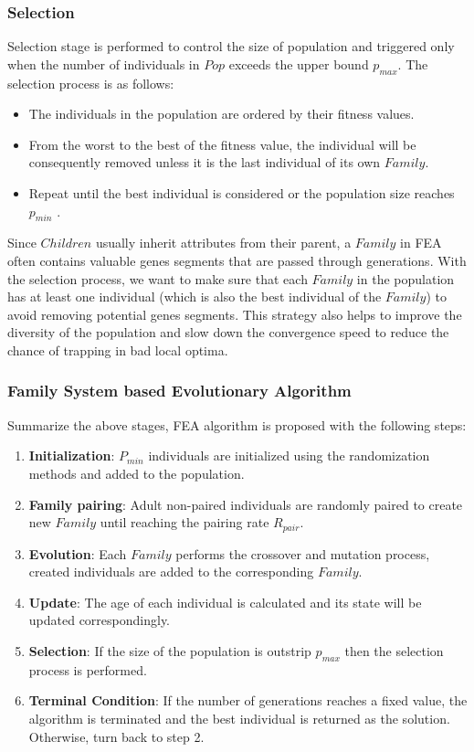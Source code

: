 \documentclass[final]{elsarticle}
\begin{document}
\subsubsection{Selection}

Selection stage is performed to control the size of population and triggered only when the number of individuals in $Pop$ exceeds the upper bound $p_{max}$. The selection process is as follows: 
\begin{itemize}
	\item The individuals in the population are ordered by their fitness values. 
	\item From the worst to the best of the fitness value, the individual will be consequently removed unless it is the last individual of its own $ Family $. 
	\item Repeat until the best individual is considered or the population size reaches $p_{min}$ .
\end{itemize}
Since $Children$ usually inherit attributes from their parent, a $Family$ in FEA often contains valuable genes segments that are passed through generations. With the selection process, we want to make sure that each $ Family $ in the population has at least one individual (which is also the best individual of the $ Family $) to avoid removing potential genes segments. This strategy also helps to improve the diversity of the population and slow down the convergence speed to reduce the chance of trapping in bad local optima.

\subsubsection{Family System based Evolutionary Algorithm}

Summarize the above stages, FEA algorithm is proposed with the following steps:

\begin{enumerate}
	\item \textbf{Initialization}: $P_{min}$ individuals are initialized using the randomization methods and added to the population.
	\item \textbf{Family pairing}: Adult non-paired individuals are randomly paired to create new $ Family $ until reaching the pairing rate $R_{pair}$.
	\item \textbf{Evolution}: Each $ Family $ performs the crossover and mutation process, created individuals are added to the corresponding $ Family $.
	\item \textbf{Update}: The age of each individual is calculated and its state will be updated correspondingly.
	\item \textbf{Selection}: If the size of the population is outstrip $p_{max}$ then the selection process is performed.
	\item \textbf{Terminal Condition}: If the number of generations reaches a fixed value, the algorithm is terminated and the best individual is returned as the solution. Otherwise, turn back to step 2.
\end{enumerate}
\end{document}
